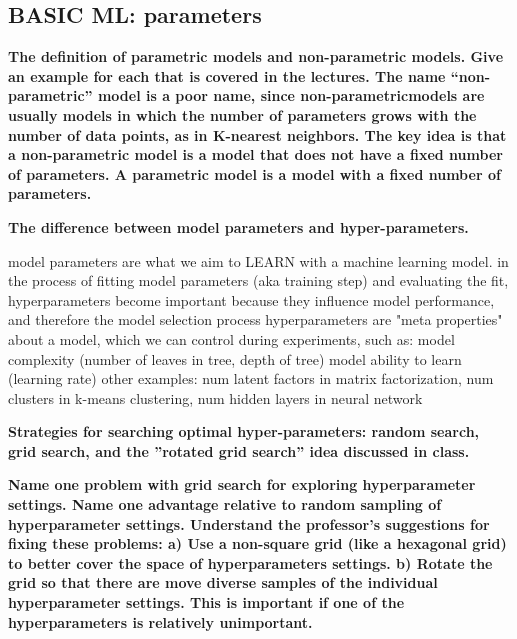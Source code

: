 \documentclass[10pt,letterpaper]{article}
\begin{document}
\subsection{BASIC ML: parameters}
\subitem \textbf{ The definition of parametric models and non-parametric models. Give an example for each that is covered in the lectures. The name “non-parametric” model is a poor name, since non-parametricmodels are usually models in which the number of parameters grows with the number of data points, as in K-nearest neighbors. The key idea is that a non-parametric model is a model that does not have a fixed number of parameters. A parametric model is a model with a fixed number of parameters. }
\begin{solution}
\end{solution}

\subitem \textbf{ The difference between model parameters and hyper-parameters.}
\begin{solution}
model parameters are what we aim to LEARN with a machine learning model. in the process of fitting model parameters (aka training step) and evaluating the fit, hyperparameters become important because they influence model performance, and therefore the model selection process 
\newline
hyperparameters are "meta properties" about a model, which we can control during experiments, such as:
\subitem model complexity (number of leaves in tree, depth of tree)
\subitem model ability to learn (learning rate)
\subitem other examples: num latent factors in matrix factorization, num clusters in k-means clustering, num hidden layers in neural network
\end{solution}

\subitem \textbf{ Strategies for searching optimal hyper-parameters: random search, grid search, and the ”rotated grid search” idea discussed in class.}
\begin{solution}
\end{solution}

\subitem \textbf{ Name one problem with grid search for exploring hyperparameter settings. Name one advantage relative to random sampling of hyperparameter settings. Understand the professor’s suggestions for fixing these problems: 
\subsubitem  a) Use a non-square grid (like a hexagonal grid) to better cover the space of hyperparameters settings.
\subsubitem  b) Rotate the grid so that there are move diverse samples of the individual hyperparameter settings. This is important if one of the hyperparameters is relatively unimportant.}
\begin{solution}
\end{solution}
\end{document}
